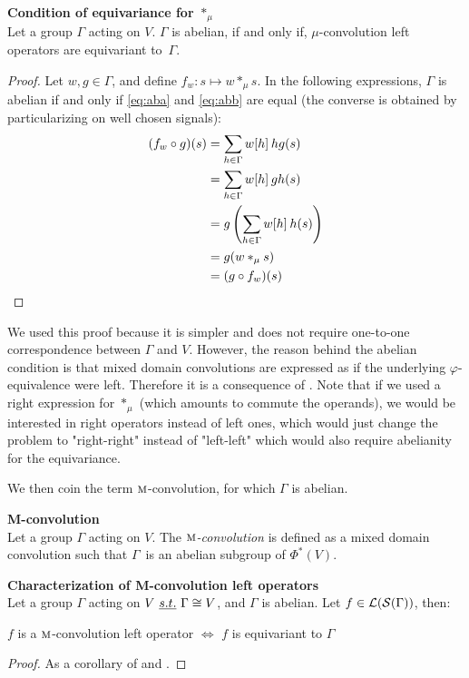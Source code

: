 \begin{proposition}\textbf{Condition of equivariance for $\ast_\mu$}\\
Let a group $\Gamma$ acting on $V$. $\Gamma$ is abelian, if and only if, $\mu$-convolution left operators are equivariant to~$\Gamma$.
\label{prop:equiM}
\end{proposition}
\begin{proof}
Let $w, g \in \Gamma$, and define $f_w: s \mapsto w \ast_\mu s$. In the following expressions, $\Gamma$ is abelian if and only if \eqref{eq:aba} and \eqref{eq:abb} are equal (the converse is obtained by particularizing on well chosen signals):
\begin{align}
(f_w \circ g) (s) & = \displaystyle \sum_{h \in \Gamma} w[h] \h{2} hg(s) \label{eq:aba}\\
 & = \displaystyle \sum_{h \in \Gamma} w[h] \h{2} gh(s) \label{eq:abb}\\
 & = \displaystyle g\left(\sum_{h \in \Gamma} w[h] \h{2} h(s)\right) \nn\\
 & = g(w \ast_\mu s ) \nn\\
 & = (g \circ f_w) (s) \nn
\end{align}
\end{proof}

\begin{remark}
We used this proof because it is simpler and does not require one-to-one correspondence between $\Gamma$ and $V$. However, the reason behind the abelian condition is that mixed domain convolutions are expressed as if the underlying $\varphi$-equivalence were left. Therefore it is a consequence of . Note that if we used a right expression for $\ast_\mu$ (which amounts to commute the operands), we would be interested in right operators instead of left ones, which would just change the problem to "right-right" instead of "left-left" which would also require abelianity for the equivariance.
\end{remark}

We then coin the term $\M$-convolution, for which $\Gamma$ is abelian.

\begin{definition}\textbf{M-convolution}\\
Let a group $\Gamma$ acting on $V$.
The \emph{$\M$-convolution} is defined as a mixed domain convolution such that $\Gamma$~is an abelian subgroup of $\Phi^*(V)$.
\label{def:convM}
\end{definition}

\begin{corollary}\textbf{Characterization of M-convolution left operators}\\
Let a group $\Gamma$ acting on $V~\st \Gamma \cong V$, and $\Gamma$ is abelian. Let $f \in \cl(\cs(\Gamma))$, then:\\
\centerline{$f$ is a $\M$-convolution left operator $\Leftrightarrow$ $f$ is equivariant to $\Gamma$}
\label{cor:equiM}
\end{corollary}
\begin{proof}As a corollary of  and .
\end{proof}

